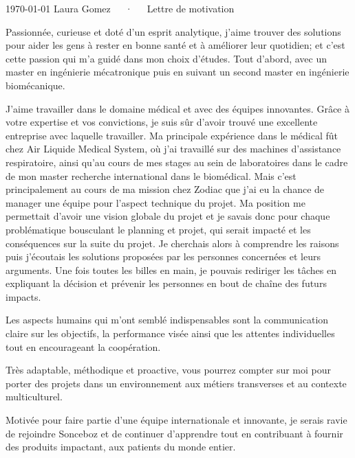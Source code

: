 \documentclass[11pt, a4paper]{awesome-cv}
\begin{document}
\makecvheader[R]

\makecvfooter
  {\today}
  {Laura Gomez~~~·~~~Lettre de motivation}
  {}

\makelettertitle

\begin{cvletter}
Passionnée, curieuse et doté d'un esprit analytique, j'aime trouver des solutions pour aider les gens à rester en bonne santé et à améliorer leur quotidien;
et c'est cette passion qui m'a guidé dans mon choix d'études. Tout d'abord, avec un master en ingénierie mécatronique puis en suivant un second master en ingénierie biomécanique.

J'aime travailler dans le domaine médical et avec des équipes innovantes. Grâce à votre expertise et vos convictions, je suis sûr d'avoir trouvé une excellente entreprise avec laquelle travailler.
Ma principale expérience dans le médical fût chez Air Liquide Medical System, où j'ai travaillé sur des machines d'assistance respiratoire, ainsi qu'au cours de mes stages au sein de laboratoires dans le cadre de mon master recherche international dans le biomédical.
Mais c'est principalement au cours de ma mission chez Zodiac que j'ai eu la chance de manager une équipe pour l'aspect technique du projet.
Ma position me permettait d'avoir une vision globale du projet et je savais donc pour chaque problématique bousculant le planning et projet, qui serait impacté et les conséquences sur la suite du projet.
Je cherchais alors à comprendre les raisons puis j'écoutais les solutions proposées par les personnes concernées et leurs arguments.
Une fois toutes les billes en main, je pouvais rediriger les tâches en expliquant la décision et prévenir les personnes en bout de chaîne des futurs impacts.

Les aspects humains qui m'ont semblé indispensables sont la communication claire sur les objectifs, la performance visée ainsi que les attentes individuelles tout en encourageant la coopération.

Très adaptable, méthodique et proactive, vous pourrez compter sur moi pour porter des projets dans un environnement aux métiers transverses et au contexte multiculturel.

Motivée pour faire partie d'une équipe internationale et innovante, je serais ravie de rejoindre Sonceboz et de continuer d'apprendre tout en contribuant à fournir des produits impactant, aux patients du monde entier.
\end{cvletter}

\makeletterclosing
\end{document}
